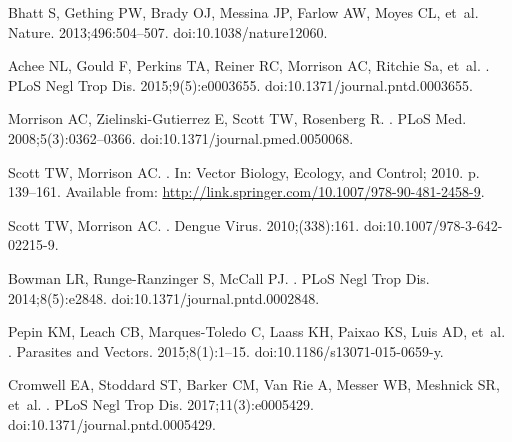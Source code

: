 \documentclass[10pt,letterpaper]{article}
\begin{document}
\begin{thebibliography}{10}

Bhatt S, Gething PW, Brady OJ, Messina JP, Farlow AW, Moyes CL, et~al.
\newblock Nature. 2013;496:504--507.
\newblock doi:{10.1038/nature12060}.

Achee NL, Gould F, Perkins TA, Reiner RC, Morrison AC, Ritchie Sa, et~al.
.
\newblock PLoS Negl Trop Dis. 2015;9(5):e0003655.
\newblock doi:{10.1371/journal.pntd.0003655}.

Morrison AC, Zielinski-Gutierrez E, Scott TW, Rosenberg R.
.
\newblock PLoS Med. 2008;5(3):0362--0366.
\newblock doi:{10.1371/journal.pmed.0050068}.

Scott TW, Morrison AC.
.
\newblock In: Vector Biology, Ecology, and Control; 2010. p. 139--161.
\newblock Available from:
  \url{http://link.springer.com/10.1007/978-90-481-2458-9}.

Scott TW, Morrison AC.
.
\newblock Dengue Virus. 2010;(338):161.
\newblock doi:{10.1007/978-3-642-02215-9}.

Bowman LR, Runge-Ranzinger S, McCall PJ.
.
\newblock PLoS Negl Trop Dis. 2014;8(5):e2848.
\newblock doi:{10.1371/journal.pntd.0002848}.

Pepin KM, Leach CB, Marques-Toledo C, Laass KH, Paixao KS, Luis AD, et~al.
.
\newblock Parasites and Vectors. 2015;8(1):1--15.
\newblock doi:{10.1186/s13071-015-0659-y}.

Cromwell EA, Stoddard ST, Barker CM, {Van Rie} A, Messer WB, Meshnick SR,
  et~al.
.
\newblock PLoS Negl Trop Dis. 2017;11(3):e0005429.
\newblock doi:{10.1371/journal.pntd.0005429}.


\end{thebibliography}
\end{document}
